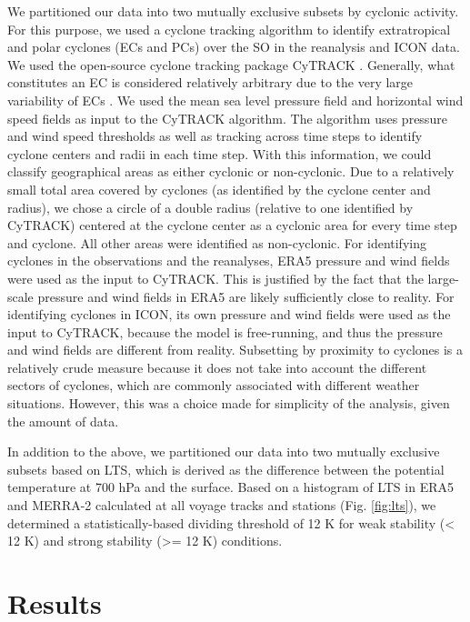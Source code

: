 \documentclass[draft]{agujournal2019}
\begin{document}
We partitioned our data into two mutually exclusive subsets by cyclonic activity. For this purpose, we used a cyclone tracking algorithm to identify extratropical and polar cyclones (ECs and PCs) over the SO in the reanalysis and ICON data. We used the open-source cyclone tracking package CyTRACK . Generally, what constitutes an EC is considered relatively arbitrary due to the very large variability of ECs . We used the mean sea level pressure field and horizontal wind speed fields as input to the CyTRACK algorithm. The algorithm uses pressure and wind speed thresholds as well as tracking across time steps to identify cyclone centers and radii in each time step. With this information, we could classify geographical areas as either cyclonic or non-cyclonic. Due to a relatively small total area covered by cyclones (as identified by the cyclone center and radius), we chose a circle of a double radius (relative to one identified by CyTRACK) centered at the cyclone center as a cyclonic area for every time step and cyclone. All other areas were identified as non-cyclonic. For identifying cyclones in the observations and the reanalyses, ERA5 pressure and wind fields were used as the input to CyTRACK. This is justified by the fact that the large-scale pressure and wind fields in ERA5 are likely sufficiently close to reality. For identifying cyclones in ICON, its own pressure and wind fields were used as the input to CyTRACK, because the model is free-running, and thus the pressure and wind fields are different from reality. Subsetting by proximity to cyclones is a relatively crude measure because it does not take into account the different sectors of cyclones, which are commonly associated with different weather situations. However, this was a choice made for simplicity of the analysis, given the amount of data.

In addition to the above, we partitioned our data into two mutually exclusive subsets based on LTS, which is derived as the difference between the potential temperature at 700 hPa and the surface. Based on a histogram of LTS in ERA5 and MERRA-2 calculated at all voyage tracks and stations (Fig. \ref{fig:lts}), we determined a statistically-based dividing threshold of 12 K for weak stability (< 12 K) and strong stability (>= 12 K) conditions.

\section{Results}
\label{sec:results}
\end{document}

